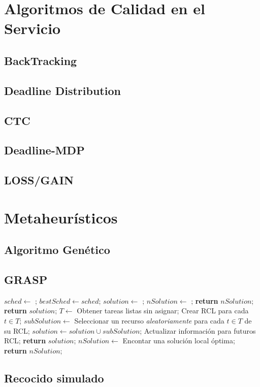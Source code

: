 \section{Algoritmos de Calidad en el Servicio}
\subsection{BackTracking}

\subsection{Deadline Distribution}
\subsection{CTC}
\subsection{Deadline-MDP}
\subsection{LOSS/GAIN}

\section{Metaheurísticos}
\subsection{Algoritmo Genético}

\subsection{GRASP}
\label{alg:grasp}
\begin{algorithmic}[1]
	\State $sched \gets$ ;
		\State $bestSched \gets sched$;
	\EndIf
\EndWhile
{}
	\State $solution \gets$ ;
	\State $nSolution \gets$ ;
		\State \textbf{return} $nSolution$;
	\EndIf
	\State \textbf{return} $solution$;
\EndProcedure
{}
		\State $T \gets$ Obtener tareas listas sin asignar;
		\State Crear RCL para cada $t \in T$;
		\State $subSolution \gets$ Seleccionar un recurso \emph{aleatoriamente} para cada $t \in T$ de su RCL;
		\State $solution \gets solution \cup subSolution$;
		\State Actualizar información para futuros RCL;
	\EndWhile
	\State \textbf{return} $solution$;
\EndProcedure
{}
	\State $nSolution \gets$ Encontar una solución local óptima;
	\State \textbf{return} $nSolution$;
\EndProcedure
\end{algorithmic}

\subsection{Recocido simulado}
